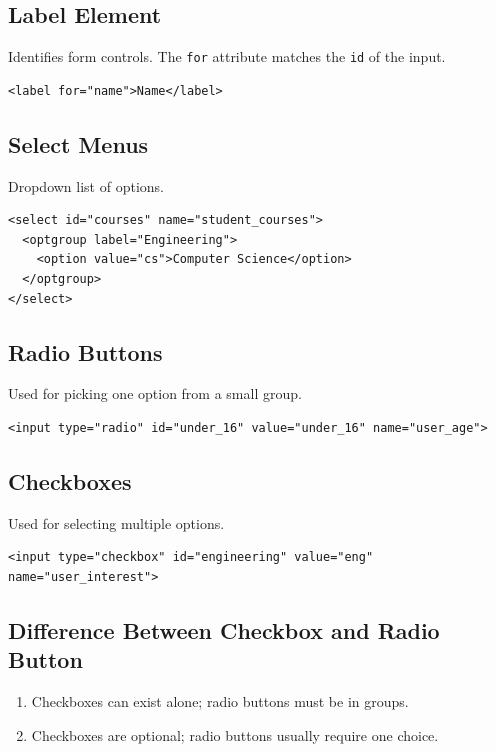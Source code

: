 \documentclass[12pt,a4paper]{article}
\begin{document}
\subsection*{Label Element}
Identifies form controls. The \texttt{for} attribute matches the \texttt{id} of the input.
\begin{verbatim}
<label for="name">Name</label>
\end{verbatim}

\subsection*{Select Menus}
Dropdown list of options.
\begin{verbatim}
<select id="courses" name="student_courses">
  <optgroup label="Engineering">
    <option value="cs">Computer Science</option>
  </optgroup>
</select>
\end{verbatim}

\subsection*{Radio Buttons}
Used for picking one option from a small group.
\begin{verbatim}
<input type="radio" id="under_16" value="under_16" name="user_age">
\end{verbatim}

\subsection*{Checkboxes}
Used for selecting multiple options.
\begin{verbatim}
<input type="checkbox" id="engineering" value="eng" name="user_interest">
\end{verbatim}

\subsection*{Difference Between Checkbox and Radio Button}
\begin{enumerate}
    \item Checkboxes can exist alone; radio buttons must be in groups.
    \item Checkboxes are optional; radio buttons usually require one choice.
\end{enumerate}
\end{document}
